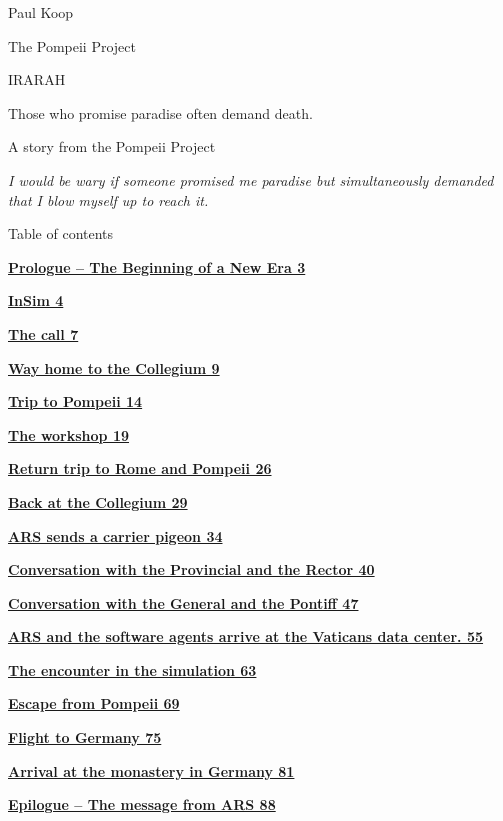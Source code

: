 \documentclass[
]{article}
\author{}
\date{}
\begin{document}
{
\setcounter{tocdepth}{3}
\tableofcontents
}
Paul Koop

The Pompeii Project

IRARAH

Those who promise paradise often demand death.

A story from the Pompeii Project

\emph{I would be wary if someone promised me paradise but simultaneously demanded that I blow myself up to reach it.}

Table of contents

\hyperref[prologue-the-beginning-of-a-new-era]{\textbf{Prologue -- The Beginning of a New Era 3}}

\hyperref[insim]{\textbf{InSim 4}}

\hyperref[the-call]{\textbf{The call 7}}

\hyperref[way-home-to-the-collegium]{\textbf{Way home to the Collegium 9}}

\hyperref[trip-to-pompeii]{\textbf{Trip to Pompeii 14}}

\hyperref[the-workshop]{\textbf{The workshop 19}}

\hyperref[return-trip-to-rome-and-pompeii]{\textbf{Return trip to Rome and Pompeii 26}}

\hyperref[back-at-the-collegium]{\textbf{Back at the Collegium 29}}

\hyperref[ars-sends-a-carrier-pigeon]{\textbf{ARS sends a carrier pigeon 34}}

\hyperref[conversation-with-the-provincial-and-the-rector]{\textbf{Conversation with the Provincial and the Rector 40}}

\hyperref[conversation-with-the-general-and-the-pontiff]{\textbf{Conversation with the General and the Pontiff 47}}

\hyperref[ars-and-the-software-agents-arrive-at-the-vatican-data-center.]{\textbf{ARS and the software agents arrive at the Vatican\textquotesingle s data center. 55}}

\hyperref[the-encounter-in-the-simulation]{\textbf{The encounter in the simulation 63}}

\hyperref[escape-from-pompeii]{\textbf{Escape from Pompeii 69}}

\hyperref[flight-to-germany]{\textbf{Flight to Germany 75}}

\hyperref[arrival-at-the-monastery-in-germany]{\textbf{Arrival at the monastery in Germany 81}}

\hyperref[epilogue-the-message-from-ars]{\textbf{Epilogue -- The message from ARS 88}}
\end{document}
